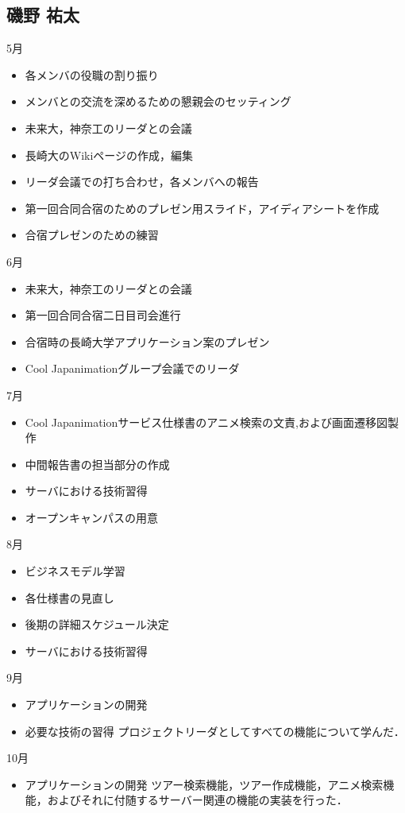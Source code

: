 \subsection{磯野 祐太}
5月
\begin{itemize}
\item 各メンバの役職の割り振り 
\item メンバとの交流を深めるための懇親会のセッティング 
\item 未来大，神奈工のリーダとの会議 
\item 長崎大のWikiページの作成，編集 
\item リーダ会議での打ち合わせ，各メンバへの報告 
\item 第一回合同合宿のためのプレゼン用スライド，アイディアシートを作成 
\item 合宿プレゼンのための練習 
\end{itemize}
6月
\begin{itemize}
\item 未来大，神奈工のリーダとの会議 
\item 第一回合同合宿二日目司会進行 
\item 合宿時の長崎大学アプリケーション案のプレゼン 
\item Cool Japanimationグループ会議でのリーダ 
\end{itemize}
7月
\begin{itemize}
\item Cool Japanimationサービス仕様書のアニメ検索の文責,および画面遷移図製作 
\item 中間報告書の担当部分の作成 
\item サーバにおける技術習得 
\item オープンキャンパスの用意 
\end{itemize}
8月
\begin{itemize}
\item ビジネスモデル学習 
\item 各仕様書の見直し 
\item 後期の詳細スケジュール決定 
\item サーバにおける技術習得 
\end{itemize}
9月
\begin{itemize}
\item アプリケーションの開発 
\item 必要な技術の習得 
プロジェクトリーダとしてすべての機能について学んだ．
\end{itemize}
10月
\begin{itemize} 
\item アプリケーションの開発
ツアー検索機能，ツアー作成機能，アニメ検索機能，およびそれに付随するサーバー関連の機能の実装を行った．
\end{itemize}

